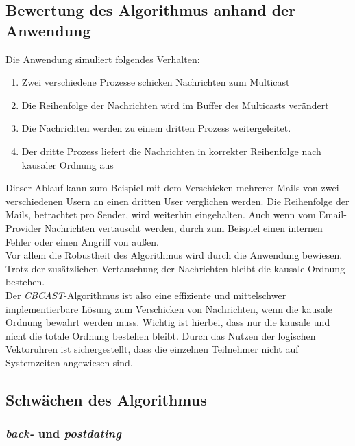 \subsection{Bewertung des Algorithmus anhand der Anwendung}

Die Anwendung simuliert folgendes Verhalten:

\begin{enumerate}
    \item Zwei verschiedene Prozesse schicken Nachrichten zum Multicast
    \item Die Reihenfolge der Nachrichten wird im Buffer des Multicasts verändert
    \item Die Nachrichten werden zu einem dritten Prozess weitergeleitet.
    \item Der dritte Prozess liefert die Nachrichten in korrekter Reihenfolge nach kausaler Ordnung aus
\end{enumerate}

Dieser Ablauf kann zum Beispiel mit dem Verschicken mehrerer Mails von zwei verschiedenen Usern an einen dritten User verglichen werden. Die Reihenfolge der Mails, betrachtet pro Sender, wird weiterhin eingehalten. Auch wenn vom Email-Provider Nachrichten vertauscht werden, durch zum Beispiel einen internen Fehler oder einen Angriff von außen.\\

Vor allem die Robustheit des Algorithmus wird durch die Anwendung bewiesen. Trotz der zusätzlichen Vertauschung der Nachrichten bleibt die kausale Ordnung bestehen.\\
Der \textit{CBCAST}-Algorithmus ist also eine effiziente und mittelschwer implementierbare Lösung zum Verschicken von Nachrichten, wenn die kausale Ordnung bewahrt werden muss. Wichtig ist hierbei, dass nur die kausale und nicht die totale Ordnung bestehen bleibt. Durch das Nutzen der logischen Vektoruhren ist sichergestellt, dass die einzelnen Teilnehmer nicht auf Systemzeiten angewiesen sind.\\

\subsection{Schwächen des Algorithmus}

\subsubsection{\textit{back-} und \textit{postdating}}

